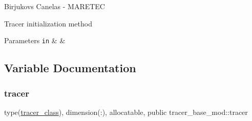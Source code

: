 Birjukovs Canelas -\/ M\+A\+R\+E\+T\+EC 

Tracer initialization method 
\begin{DoxyParams}[1]{Parameters}
\mbox{\tt in}  & {\em } & \\
\hline
\end{DoxyParams}


\subsection{Variable Documentation}
\mbox{\label{namespacetracer__base__mod_a8e683639ef8cd4f4bdcff33fffe21fc2}} 
\subsubsection{\texorpdfstring{tracer}{tracer}}
{\footnotesize\ttfamily type(\hyperlink{structtracer__base__mod_1_1tracer__class}{tracer\+\_\+class}), dimension(\+:), allocatable, public tracer\+\_\+base\+\_\+mod\+::tracer}

